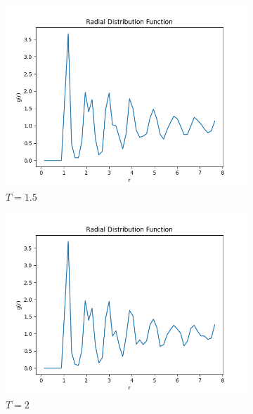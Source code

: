 \documentclass{article}
\begin{document}
\begin{figure}[H]
    \begin{subfigure}{0.495\textwidth}
        \centering
        \includegraphics[width=\textwidth]{images/Radial1.5.png}
        \caption{$T=1.5$}
    \end{subfigure}
    \hfill
    \begin{subfigure}{0.495\textwidth}
        \centering
        \includegraphics[width=\textwidth]{images/radial2.png}
        \caption{$T=2$}
    \end{subfigure}
    \medskip
    \begin{subfigure}{0.495\textwidth}
        \centering

\end{subfigure}
\end{figure}
\end{document}
